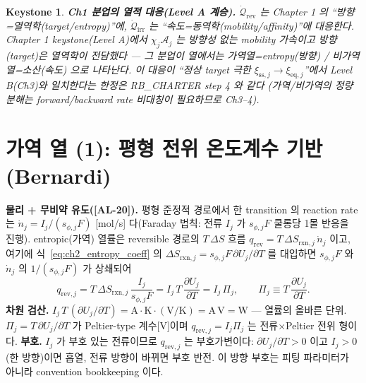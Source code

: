 \documentclass[11pt,a4paper]{article}
\newtheorem*{keybox}{Keystone}
\newcommand{\eq}{\mathrm{eq}}
\newcommand{\irr}{\mathrm{irr}}
\newcommand{\rev}{\mathrm{rev}}
\newcommand{\rxn}{\mathrm{rxn}}
\newcommand{\AL}[1]{\textsf{[AL-#1]}}
\begin{document}
\begin{keybox}
\textbf{Ch1 분업의 열적 대응(Level A 계승).} $\dot{\mathcal Q}_{\rev}$ 는 Chapter 1 의 ``방향=열역학(target/entropy)''에,
$\dot{\mathcal Q}_{\irr}$ 는 ``속도=동역학(mobility/affinity)''에 대응한다. Chapter 1 keystone(Level A)에서
$\chi_j\mathcal A_j$ 는 방향성 없는 mobility 가속이고 방향(target)은 열역학이 전담했다 — 그 분업이 열에서는
\emph{가역열=entropy(방향) / 비가역열=소산(속도)} 으로 나타난다. 이 대응이 ``정상 target 극한
$\xi_{\mathrm{ss},j}\to\xi_{\eq,j}$''에서 Level B(Ch3)와 일치한다는 한정은 RB\_CHARTER step 4 와 같다
(가역/비가역의 \emph{정량} 분해는 forward/backward rate 비대칭이 필요하므로 Ch3--4).
\end{keybox}

\section{가역 열 (1): 평형 전위 온도계수 기반 (Bernardi)}\label{sec:ch2_revOCV}
\textbf{물리 + 무비약 유도(\AL{20}).} 평형 준정적 경로에서 한 transition 의 reaction rate 는
$\dot n_j=I_j/(s_{\phi,j}F)$ [mol/s] 다(Faraday 법칙: 전류 $I_j$ 가 $s_{\phi,j}F$ 쿨롱당 1몰 반응을 진행).
entropic(가역) 열률은 reversible 경로의 $T\,\Delta S$ 흐름 $q_\rev=T\,\Delta S_{\rxn,j}\,\dot n_j$ 이고, 여기에
식~\eqref{eq:ch2_entropy_coeff} 의 $\Delta S_{\rxn,j}=s_{\phi,j}F\,\partial U_j/\partial T$ 를 대입하면
$s_{\phi,j}F$ 와 $\dot n_j$ 의 $1/(s_{\phi,j}F)$ 가 상쇄되어
\begin{equation}
\boxed{\;q_{\rev,j}=T\,\Delta S_{\rxn,j}\,\frac{I_j}{s_{\phi,j}F}=I_j\,T\,\frac{\partial U_j}{\partial T}
=I_j\,\Pi_j,\qquad \Pi_j\equiv T\,\frac{\partial U_j}{\partial T}.\;}
\label{eq:ch2_qrev}
\end{equation}
\textbf{차원 검산.} $I_j\,T\,(\partial U_j/\partial T)=\mathrm A\cdot\mathrm K\cdot(\mathrm{V/K})=\mathrm{A\,V}=\mathrm W$
— 열률의 올바른 단위. $\Pi_j=T\,\partial U_j/\partial T$ 가 Peltier-type 계수[V]이며 $q_{\rev,j}=I_j\Pi_j$ 는
전류$\times$Peltier 전위 형이다. \textbf{부호.} $I_j$ 가 부호 있는 전류이므로 $q_{\rev,j}$ 는 부호가변이다:
$\partial U_j/\partial T>0$ 이고 $I_j>0$(한 방향)이면 흡열, 전류 방향이 바뀌면 부호 반전. 이 방향 부호는 피팅
파라미터가 아니라 convention bookkeeping 이다.
\end{document}
